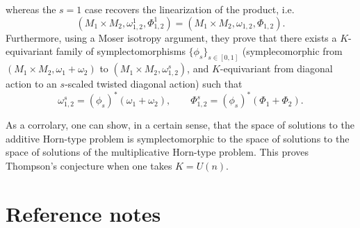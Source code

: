 \documentclass[notitlepage]{article}
\begin{document}
whereas the $s=1$ case recovers the linearization of the product, i.e.
\begin{equation}
    (M_1\times M_2, \omega^{1}_{1,2}, \Phi^{1}_{1,2}) = (M_1 \times M_2, \omega_{1,2}, \Phi_{1,2}).
\end{equation}
Furthermore, using a Moser isotropy argument, they prove that there exists a $K$-equivariant family of symplectomorphisms $\{\phi_s\}_{s \in [0,1]}$ (symplecomorphic from $(M_1 \times M_2, \omega_{1} + \omega_{2})$ to $(M_1 \times M_2, \omega_{1,2}^{s})$, and $K$-equivariant from diagonal action to an $s$-scaled twisted diagonal action) such that
\begin{equation}
    \omega_{1,2}^{s} = (\phi_s)^{*} (\omega_1 + \omega_2), \qquad \Phi_{1,2}^{s} = (\phi_s)^{*} (\Phi_1 + \Phi_2).
\end{equation}

As a corrolary, one can show, in a certain sense, that the space of solutions to the additive Horn-type problem is symplectomorphic to the space of solutions to the space of solutions of the multiplicative Horn-type problem.
This proves Thompson's conjecture when one takes $K = U(n)$.


\clearpage
\section*{Reference notes}
\end{document}
